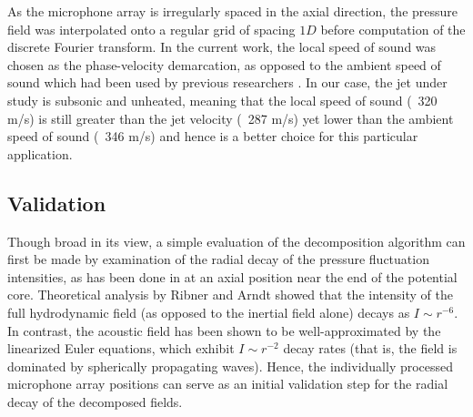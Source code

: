 As the microphone array is irregularly spaced in the axial direction, the pressure field was interpolated onto a regular grid of spacing $1D$ before computation of the discrete Fourier transform. 
In the current work, the local speed of sound was chosen as the phase-velocity demarcation, as opposed to the ambient speed of sound which had been used by previous researchers \citep{Tinney2008}. 
In our case, the jet under study is subsonic and unheated, meaning that the local speed of sound (~320 m/s) is still greater than the jet velocity (~287 m/s) yet lower than the ambient speed of sound (~346 m/s) and hence is a better choice for this particular application.
\subsection{Validation}
Though broad in its view, a simple evaluation of the decomposition algorithm can first be made by examination of the radial decay of the pressure fluctuation intensities, as has been done in   at an axial position near the end of the potential core. 
Theoretical analysis by Ribner \citep{Ribner1962} and Arndt \etal \citep{Arndt1997} showed that the intensity of the full hydrodynamic field (as opposed to the inertial field alone) decays as $I \sim r^{-6}$. 
In contrast, the acoustic field has been shown to be well-approximated by the linearized Euler equations, which exhibit $I \sim r^{-2}$ decay rates (that is, the field is dominated by spherically propagating waves). 
Hence, the individually processed microphone array positions can serve as an initial validation step for the radial decay of the decomposed fields.

